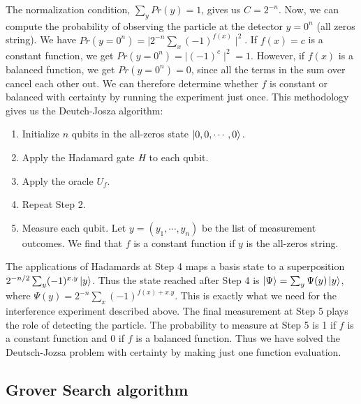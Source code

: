 \documentclass[12pt]{article}
\begin{document}
    \noindent
    The normalization condition, $\sum_{y}Pr(y) = 1$, gives us $C = 2^{-n}$. Now, we can compute the probability  of observing the particle at the detector $y = 0^n$ (all zeros string). We have $Pr(y=0^{n}) = \mid2^{-n}\sum_{x}(-1)^{f(x)}\mid^2$. If $f(x) = c$ is a constant function, we get $Pr(y=0^{n}) = \mid(-1)^c\mid^2 = 1$. However, if $f(x)$ is a balanced function, we get $Pr(y=0^{n}) = 0$, since all the terms in the sum over  cancel each other out. We can therefore determine whether $f$ is constant or balanced with certainty by running the experiment just once. This methodology gives us the Deutch-Josza algorithm:
    
    \begin{enumerate}
        \item Initialize $n$ qubits in the all-zeros state $\ket{0,0,\cdots,0}.$
        \item Apply the Hadamard gate $\mbox{\em{H}}$ to each qubit.
        \item Apply the oracle $U_{f}$.
        \item Repeat Step 2.
        \item  Measure each qubit. Let $y = (y_1, \cdots, y_n)$ be the list of measurement outcomes. We find that $f$ is a constant function if $y$ is the all-zeros string.
    \end{enumerate}
    
    \noindent
   The applications of Hadamards at Step 4 maps a basis state  to a superposition $2^{-n/2}\sum_{y}(-1)^{x.y}\ket{y}$. Thus the state reached after Step 4 is $\ket{\Psi} = \sum_{y}\Psi(y)\ket{y}$, where $\Psi (y) = 2^{-n}\sum_{x}(-1)^{f(x)+x.y}$. This is exactly what we need for the interference experiment described above. The final measurement at Step 5 plays the role of detecting the particle. The probability to measure  at Step 5 is 1 if $f$ is a constant function and 0 if $f$ is a balanced function. Thus we have solved the Deutsch-Jozsa problem with certainty by making just one function evaluation.
    
    
    
    \subsection{Grover Search algorithm}
    
\end{document}
